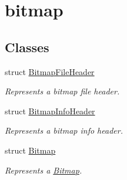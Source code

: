 \hypertarget{group__bitmap}{}\section{bitmap}
\label{group__bitmap}
\subsection*{Classes}
\begin{DoxyCompactItemize}
\item 
struct \mbox{\hyperlink{struct_bitmap_file_header}{Bitmap\+File\+Header}}
\begin{DoxyCompactList}\small\item\em Represents a bitmap file header. \end{DoxyCompactList}\item 
struct \mbox{\hyperlink{struct_bitmap_info_header}{Bitmap\+Info\+Header}}
\begin{DoxyCompactList}\small\item\em Represents a bitmap info header. \end{DoxyCompactList}\item 
struct \mbox{\hyperlink{struct_bitmap}{Bitmap}}
\begin{DoxyCompactList}\small\item\em Represents a \mbox{\hyperlink{struct_bitmap}{Bitmap}}. \end{DoxyCompactList}\end{DoxyCompactItemize}
